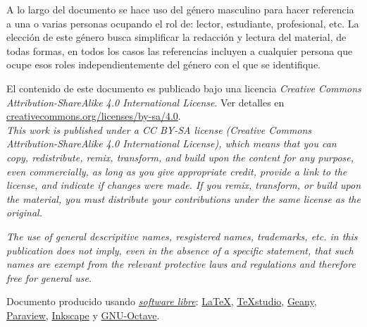 A lo largo del documento se hace uso del género masculino para hacer referencia a una o varias personas ocupando el rol de: lector, estudiante, profesional, etc. La elección de este género busca simplificar la redacción y lectura del material, de todas formas, en todos los casos las referencias incluyen a cualquier persona que ocupe esos roles independientemente del género con el que se identifique.

\vfill
\begin{small}	
	\noindent
	El contenido de este documento es publicado bajo una licencia \textit{Creative Commons Attribution-ShareAlike 4.0 International License}. Ver detalles en
	\href{https://creativecommons.org/licenses/by-sa/4.0/}{creativecommons.org/licenses/by-sa/4.0}.\\
	
	\noindent
\textit{
	This work is published under a CC BY-SA license (\textit{Creative Commons Attribution-ShareAlike 4.0 International License}), which means that you can copy, redistribute, remix, transform, and build upon the content for any purpose, even commercially, as long as you give appropriate credit, provide a link to the license, and indicate if changes were made. If you remix, transform, or build upon the material, you must distribute your contributions under the same license as the original.
}
	
	\vspace{2mm}
	
	\noindent
\textit{
	The use of general descripitive names, resgistered names, trademarks, etc. in this publication does not imply, even in the absence of a specific statement, that such names are exempt from the relevant protective laws and regulations and therefore free for general use.
}
	
\end{small}

\vspace{3mm}

\noindent
\begin{footnotesize}
	Documento producido usando \href{https://es.wikipedia.org/wiki/Software_libre}{\textit{software libre}}: \href{https://www.latex-project.org/}{\LaTeX}, \href{https://www.texstudio.org/}{TeXstudio}, \href{https://www.geany.org/}{Geany}, \href{https://www.paraview.org/}{Paraview}, \href{https://inkscape.org/}{Inkscape} y \href{https://www.gnu.org/software/octave/}{GNU-Octave}.
\end{footnotesize}

